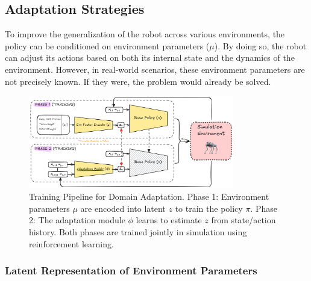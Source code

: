 \subsection{Adaptation Strategies}

To improve the generalization of the robot across various environments, the policy can be conditioned on environment parameters ($\mu$). By doing so, the robot can adjust its actions based on both its internal state and the dynamics of the environment. However, in real-world scenarios, these environment parameters are not precisely known. If they were, the problem would already be solved.

\begin{figure}[h]
	\centering
	\includegraphics[width=0.8\textwidth]{fig/domain-adaptation-training}
	\caption{Training Pipeline for Domain Adaptation. Phase 1: Environment parameters $\mu$ are encoded into latent $z$ to train the policy $\pi$. Phase 2: The adaptation module $\phi$ learns to estimate $z$ from state/action history. Both phases are trained jointly in simulation using reinforcement learning.}
	\label{fig:training-pipeline}
\end{figure}

\subsubsection{Latent Representation of Environment Parameters}

